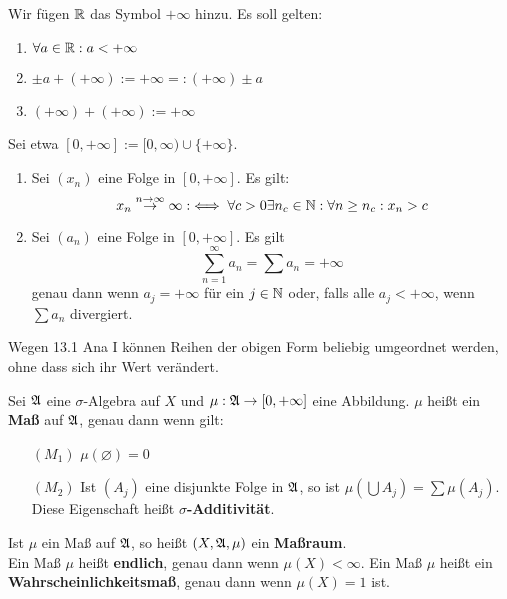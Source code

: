 \documentclass[a4paper,twoside,DIV15,BCOR12mm,chapterprefix=true,headings=onelinechapter]{scrbook}
\begin{document}
\begin{definition}
Wir fügen $\mathbb{R}$ das Symbol $+\infty$ hinzu. Es soll gelten:
\begin{enumerate}
\item $\forall a\in\mathbb{R}:a<+\infty$
\item $\pm a+(+\infty):=+\infty=:(+\infty)\pm a$
\item $(+\infty)+(+\infty):=+\infty$
\end{enumerate}
Sei etwa $[0,+\infty]:=[0,\infty)\cup\{+\infty\}$.
\begin{enumerate}
\item Sei $(x_n)$ eine Folge in $[0,+\infty]$. Es gilt:
\[x_n\stackrel{n\to\infty}{\to}\infty:\iff \forall c>0\exists n_c\in\mathbb{N}:\forall n\ge n_c: x_n> c\]
\item Sei $(a_n)$ eine Folge in $[0,+\infty]$. Es gilt
\[\sum_{n=1}^\infty a_n=\sum a_n = +\infty\]
genau dann wenn $a_j=+\infty$ für ein $j\in\mathbb{N}$ oder, falls alle $a_j<+\infty$, wenn $\sum a_n$ divergiert.
\end{enumerate} 
Wegen 13.1 Ana I können Reihen der obigen Form beliebig umgeordnet werden, ohne dass sich ihr Wert verändert.
\end{definition}

\begin{definition}
Sei $\mathfrak{A}$ eine $\sigma$-Algebra auf $X$ und $\mu:\mathfrak{A}\to[0,+\infty]$ eine Abbildung. $\mu$ heißt ein \textbf{Maß} auf $\mathfrak{A}$, genau dann wenn gilt:
\begin{enumerate}
\item[$(M_1)$] $\mu(\varnothing)=0$
\item[$(M_2)$] Ist $(A_j)$ eine disjunkte Folge in $\mathfrak{A}$, so ist $\mu(\bigcup A_j)=\sum\mu(A_j)$. Diese Eigenschaft heißt \textbf{$\sigma$-Additivität}.
\end{enumerate}
Ist $\mu$ ein Maß auf $\mathfrak{A}$, so heißt $(X,\mathfrak{A},\mu)$ ein \textbf{Maßraum}.\\
Ein Maß $\mu$ heißt \textbf{endlich}, genau dann wenn $\mu(X)<\infty$. Ein Maß $\mu$ heißt ein \textbf{Wahrscheinlichkeitsmaß}, genau dann wenn $\mu(X)=1$ ist.
\end{definition}
\end{document}
